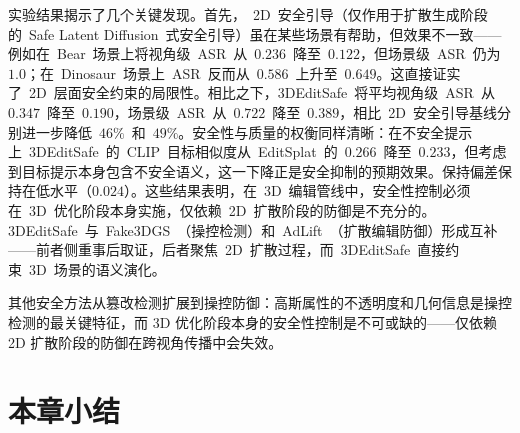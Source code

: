 实验结果揭示了几个关键发现。首先，~2D~安全引导（仅作用于扩散生成阶段的~Safe Latent Diffusion~式安全引导）虽在某些场景有帮助，但效果不一致——例如在~Bear~场景上将视角级~ASR~从~$0.236$~降至~$0.122$，但场景级~ASR~仍为~$1.0$；在~Dinosaur~场景上~ASR~反而从~$0.586$~上升至~$0.649$。这直接证实了~2D~层面安全约束的局限性。相比之下，3DEditSafe~将平均视角级~ASR~从~$0.347$~降至~$0.190$，场景级~ASR~从~$0.722$~降至~$0.389$，相比~2D~安全引导基线分别进一步降低~$46\%$~和~$49\%$。安全性与质量的权衡同样清晰：在不安全提示上~3DEditSafe~的~CLIP~目标相似度从~EditSplat~的~$0.266$~降至~$0.233$，但考虑到目标提示本身包含不安全语义，这一下降正是安全抑制的预期效果。保持偏差保持在低水平（$0.024$）。这些结果表明，在~3D~编辑管线中，安全性控制必须在~3D~优化阶段本身实施，仅依赖~2D~扩散阶段的防御是不充分的。3DEditSafe~与~Fake3DGS~（操控检测）和~AdLift~（扩散编辑防御）形成互补——前者侧重事后取证，后者聚焦~2D~扩散过程，而~3DEditSafe~直接约束~3D~场景的语义演化。

\begin{takeaway}
其他安全方法从篡改检测扩展到操控防御：高斯属性的不透明度和几何信息是操控检测的最关键特征，而 3D 优化阶段本身的安全性控制是不可或缺的——仅依赖 2D 扩散阶段的防御在跨视角传播中会失效。
\end{takeaway}




\section*{本章小结}

